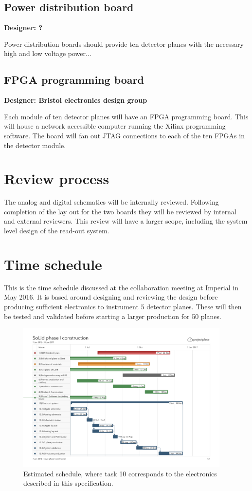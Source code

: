 \documentclass[a4paper]{article}
\begin{document}
\clearpage
\newpage
\subsection{Power distribution board}

{\bf Designer: ?}

Power distribution boards should provide ten detector planes with the necessary high and low voltage power...

\clearpage
\newpage
\subsection{FPGA programming board}

{\bf Designer: Bristol electronics design group}

Each module of ten detector planes will have an FPGA programming board.
This will house a network accessible computer running the Xilinx programming software.
The board will fan out JTAG connections to each of the ten FPGAs in the detector module.


\clearpage
\newpage

\section{Review process}

The analog and digital schematics will be internally reviewed.
Following completion of the lay out for the two boards they will be reviewed by internal and external reviewers.
This review will have a larger scope, including the system level design of the read-out system.

\section{Time schedule}

This is the time schedule discussed at the collaboration meeting at Imperial in May 2016.
It is based around designing and reviewing the design before producing sufficient electronics to instrument 5 detector planes.
These will then be tested and validated before starting a larger production for 50 planes.

\begin{figure}[h]
    \begin{center}
        \includegraphics[width=0.95\textwidth]{imgs/Gantt}
        \caption{Estimated schedule, where task 10 corresponds to the electronics described in this specification.}
        \label{fig:gantt}
    \end{center}
\end{figure}
\end{document}
